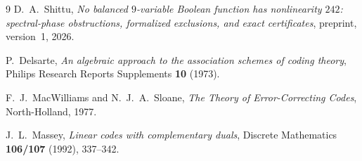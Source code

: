 \documentclass[11pt]{article}
\theoremstyle{definition}
\theoremstyle{remark}
\DeclareRobustCommand{\_}{\textunderscore\allowbreak}
\begin{document}
\begin{thebibliography}{9}
D.~A.~Shittu, \emph{No balanced $9$-variable Boolean function has nonlinearity $242$: spectral-phase obstructions, formalized exclusions, and exact certificates}, preprint, version~1, 2026.

P.~Delsarte, \emph{An algebraic approach to the association schemes of coding theory}, Philips Research Reports Supplements \textbf{10} (1973).

F.~J.~MacWilliams and N.~J.~A.~Sloane, \emph{The Theory of Error-Correcting Codes}, North-Holland, 1977.

J.~L.~Massey, \emph{Linear codes with complementary duals}, Discrete Mathematics \textbf{106/107} (1992), 337--342.
\end{thebibliography}
\end{document}
